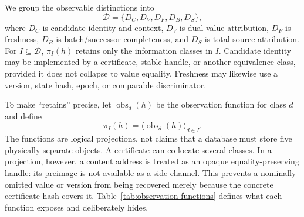 We group the observable distinctions into
\begin{equation}
\mathcal D=\{D_C,D_V,D_F,D_B,D_S\},
\label{eq:distinction-basis}
\end{equation}
where $D_C$ is candidate identity and context, $D_V$ is dual-value attribution, $D_F$ is freshness, $D_B$ is batch/successor completeness, and $D_S$ is total source attribution. For $I\subseteq\mathcal D$, $\pi_I(h)$ retains only the information classes in $I$. Candidate identity may be implemented by a certificate, stable handle, or another equivalence class, provided it does not collapse to value equality. Freshness may likewise use a version, state hash, epoch, or comparable discriminator.

To make ``retains'' precise, let $\operatorname{obs}_d(h)$ be the observation function for class $d$ and define
\begin{equation}
\pi_I(h)=\langle\operatorname{obs}_d(h)\rangle_{d\in I}.
\label{eq:observation-projection}
\end{equation}
The functions are logical projections, not claims that a database must store five physically separate objects. A certificate can co-locate several classes. In a projection, however, a content address is treated as an opaque equality-preserving handle: its preimage is not available as a side channel. This prevents a nominally omitted value or version from being recovered merely because the concrete certificate hash covers it. Table~\ref{tab:observation-functions} defines what each function exposes and deliberately hides.

